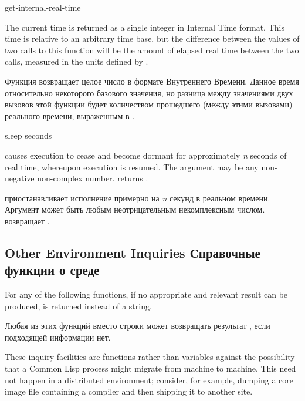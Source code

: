 \begin{defun}[Function]
get-internal-real-time 

The current time is returned as a single integer in Internal Time
format.  This time is relative to an arbitrary time base,
but the difference between the values of two calls
to this function will be the amount of elapsed real time between the two calls,
measured in the units defined by .

Функция возвращает целое число в формате Внутреннего Времени. Данное время
относительно некоторого базового значения, но разница между значениями двух
вызовов этой функции будет количеством прошедшего (между этими вызовами)
реального времени, выраженным в .
\end{defun}

\begin{defun}[Function]
sleep seconds

 causes execution to cease and become dormant for
approximately \emph{n} seconds of real time, whereupon execution is resumed.
The argument may be any non-negative non-complex number.
 returns {\nil}.

 приостанавливает исполнение примерно на \emph{n} секунд в
реальном времени.
Аргумент может быть любым неотрицательным некомплексным числом.
 возвращает {\nil}.
\end{defun}

\subsection{Other Environment Inquiries Справочные функции о среде}

For any of the following functions, if no appropriate
and relevant result can be produced, {\nil} is returned instead
of a string.

Любая из этих функций вместо строки может возвращать результат {\nil}, если
подходящей информации нет.

\beforenoterule
\begin{rationale}
These inquiry facilities are functions rather than variables
against the possibility that a Common Lisp process might migrate from
machine to machine.  This need not happen in a distributed
environment; consider, for example, dumping a core image file
containing a compiler and then shipping it to another site.
\end{rationale}
\afternoterule


